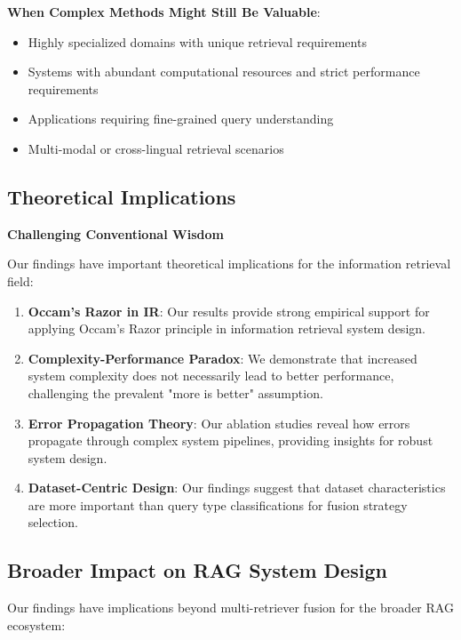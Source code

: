 \documentclass[letterpaper]{article} %
\begin{document}
\textbf{When Complex Methods Might Still Be Valuable}:
\begin{itemize}
\item Highly specialized domains with unique retrieval requirements
\item Systems with abundant computational resources and strict performance requirements
\item Applications requiring fine-grained query understanding
\item Multi-modal or cross-lingual retrieval scenarios
\end{itemize}

\subsection{Theoretical Implications}

\textbf{Challenging Conventional Wisdom}

Our findings have important theoretical implications for the information retrieval field:

\begin{enumerate}
\item \textbf{Occam's Razor in IR}: Our results provide strong empirical support for applying Occam's Razor principle in information retrieval system design.

\item \textbf{Complexity-Performance Paradox}: We demonstrate that increased system complexity does not necessarily lead to better performance, challenging the prevalent "more is better" assumption.

\item \textbf{Error Propagation Theory}: Our ablation studies reveal how errors propagate through complex system pipelines, providing insights for robust system design.

\item \textbf{Dataset-Centric Design}: Our findings suggest that dataset characteristics are more important than query type classifications for fusion strategy selection.
\end{enumerate}

\subsection{Broader Impact on RAG System Design}

Our findings have implications beyond multi-retriever fusion for the broader RAG ecosystem:
\end{document}
